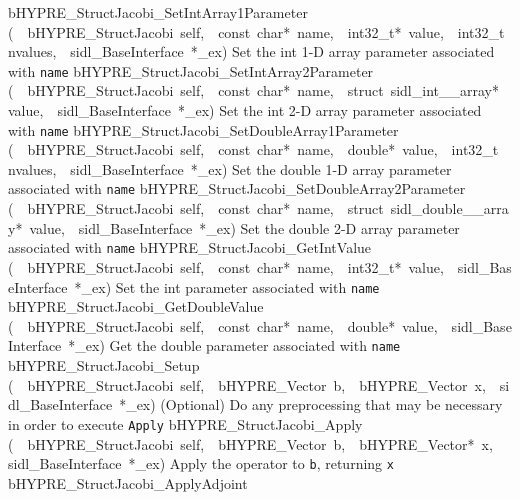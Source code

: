 \documentclass{article}
\begin{document}
\begin{cxxentry}
\begin{cxxentry}
\begin{cxxnames}
        {bHYPRE\_StructJacobi\_SetIntArray1Parameter}
        {(\ \ bHYPRE\_StructJacobi\ self,\ \ const\ char*\ name,\ \ int32\_t*\ value,\ \ int32\_t\ nvalues,\ \ sidl\_BaseInterface\ *\_ex)}
        {
Set the int 1-D array parameter associated with {\tt name}}
        {}
\label{cxx.7.2.20}
        {bHYPRE\_StructJacobi\_SetIntArray2Parameter}
        {(\ \ bHYPRE\_StructJacobi\ self,\ \ const\ char*\ name,\ \ struct\ sidl\_int\_\_array*\ value,\ \ sidl\_BaseInterface\ *\_ex)}
        {
Set the int 2-D array parameter associated with {\tt name}}
        {}
\label{cxx.7.2.21}
        {bHYPRE\_StructJacobi\_SetDoubleArray1Parameter}
        {(\ \ bHYPRE\_StructJacobi\ self,\ \ const\ char*\ name,\ \ double*\ value,\ \ int32\_t\ nvalues,\ \ sidl\_BaseInterface\ *\_ex)}
        {
Set the double 1-D array parameter associated with {\tt name}}
        {}
\label{cxx.7.2.22}
        {bHYPRE\_StructJacobi\_SetDoubleArray2Parameter}
        {(\ \ bHYPRE\_StructJacobi\ self,\ \ const\ char*\ name,\ \ struct\ sidl\_double\_\_array*\ value,\ \ sidl\_BaseInterface\ *\_ex)}
        {
Set the double 2-D array parameter associated with {\tt name}}
        {}
\label{cxx.7.2.23}
        {bHYPRE\_StructJacobi\_GetIntValue}
        {(\ \ bHYPRE\_StructJacobi\ self,\ \ const\ char*\ name,\ \ int32\_t*\ value,\ \ sidl\_BaseInterface\ *\_ex)}
        {
Set the int parameter associated with {\tt name}}
        {}
\label{cxx.7.2.24}
        {bHYPRE\_StructJacobi\_GetDoubleValue}
        {(\ \ bHYPRE\_StructJacobi\ self,\ \ const\ char*\ name,\ \ double*\ value,\ \ sidl\_BaseInterface\ *\_ex)}
        {
Get the double parameter associated with {\tt name}}
        {}
\label{cxx.7.2.25}
        {bHYPRE\_StructJacobi\_Setup}
        {(\ \ bHYPRE\_StructJacobi\ self,\ \ bHYPRE\_Vector\ b,\ \ bHYPRE\_Vector\ x,\ \ sidl\_BaseInterface\ *\_ex)}
        {
(Optional) Do any preprocessing that may be necessary in
order to execute {\tt Apply}}
        {}
\label{cxx.7.2.26}
        {bHYPRE\_StructJacobi\_Apply}
        {(\ \ bHYPRE\_StructJacobi\ self,\ \ bHYPRE\_Vector\ b,\ \ bHYPRE\_Vector*\ x,\ \ sidl\_BaseInterface\ *\_ex)}
        {
Apply the operator to {\tt b}, returning {\tt x}}
        {}
\label{cxx.7.2.27}
        {bHYPRE\_StructJacobi\_ApplyAdjoint}

\end{cxxnames}
\end{cxxentry}
\end{cxxentry}
\end{document}
